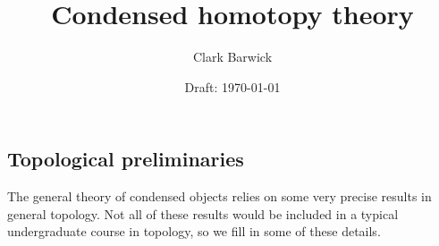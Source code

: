 \documentclass[envcountsame,envcountsect]{svmono}
\begin{document}

\author{Clark Barwick}
\title{Condensed homotopy theory}
\date{Draft: \today}
\subtitle{}
\maketitle

\frontmatter

%
%
%
%

\tableofcontents



\mainmatter


\begin{partbacktext}
	\part{Topological preliminaries}%
	\label{prt:topological_preliminaries}

	\noindent The general theory of condensed objects relies on some very precise results in general topology.
	Not all of these results would be included in a typical undergraduate course in topology,
	so we fill in some of these details.
\end{partbacktext}
\end{document}
